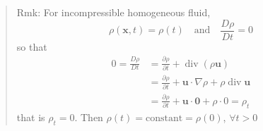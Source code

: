 \begin{quote}
	Rmk:
For incompressible homogeneous fluid,
\begin{equation}
\rho(\textbf{x},t) = \rho(t)\quad\text{and}\quad \frac{D\rho}{Dt} = 0
\end{equation}
so that
\begin{equation}
\begin{aligned}
0 = \frac{D\rho}{Dt} &= \frac{\partial\rho}{\partial t} + \operatorname{div}(\rho\textbf{u})\\
&=  \frac{\partial\rho}{\partial t} + \textbf{u}\cdot \nabla \rho + \rho \operatorname{div}\textbf{u}\\
&=  \frac{\partial\rho}{\partial t} + \textbf{u}\cdot \textbf{0} + \rho \cdot 0 =\rho_t
\end{aligned}
\end{equation}
that is $\rho_t=0$. Then $\rho(t) = \text{constant} = \rho(0)$, $\forall t>0$
\end{quote}
